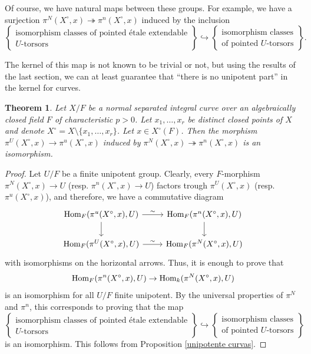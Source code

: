 \documentclass[a4paper,english,12pt]{amsart}
\newtheorem{theorem}[definition]{Theorem}
\numberwithin{equation}{section}
\newcommand{\Hom}{\textup{Hom}}
\renewcommand{\_}{\rule{0.25cm}{0.4pt}}
\begin{document}
Of course, we have natural maps between these groups. For example, we have a surjection $\pi^{N}(X^{\circ},x)\twoheadrightarrow \pi^{n}(X^{\circ},x)$ induced by the inclusion
\[
\left\{
\begin{array}{c}
\text{isomorphism classes of pointed étale extendable}\\
\text{$U$-torsors}
\end{array}
\right\}
\hookrightarrow
\left\{
\begin{array}{c}
\text{isomorphism classes}\\
\text{of pointed $U$-torsors}
\end{array}
\right\}.
\]

The kernel of this map is not known to be trivial or not, but using the results of the last section, we can at least guarantee that ``there is no unipotent part'' in the kernel for curves.

\begin{theorem}\label{unipotent fundamental group iso}
Let $X/F$ be a normal separated integral curve over an algebraically closed field $F$ of characteristic $p>0$. Let $x_{1},\dots, x_{r}$ be distinct closed points of $X$ and denote $X^{\circ}=X\setminus\{x_{1},\dots, x_{r}\}$. Let $x\in X^{\circ}(F)$. Then the morphism $\pi^{U}(X^{\circ},x)\to \pi^{u}(X^{\circ},x)$ induced by $\pi^{N}(X^{\circ},x)\twoheadrightarrow \pi^{n}(X^{\circ},x)$ is an isomorphism.
\end{theorem}
\begin{proof}
Let $U/F$ be a finite unipotent group. Clearly, every $F$-morphism $\pi^{N}(X^{\circ},x)\to U$ (resp. $\pi^{n}(X^{\circ},x)\to U$) factors trough $\pi^{U}(X^{\circ},x)$ (resp. $\pi^{u}(X^{\circ},x)$), and therefore, we have a commutative diagram
\[
\begin{tikzcd}
    \Hom_{F}(\pi^{u}(X^{\circ},x),U)\ar[r, "\sim"]\ar[d] & \Hom_{F}(\pi^{n}(X^{\circ},x),U)\ar[d]
    \\
    \Hom_{F}(\pi^{U}(X^{\circ},x),U)\ar[r, "\sim"] & \Hom_{F}(\pi^{N}(X^{\circ},x),U)
\end{tikzcd}
\]
with isomorphisms on the horizontal arrows. Thus, it is enough to prove that
\[
    \Hom_{F}(\pi^{n}(X^{\circ},x),U)\to \Hom_{k}(\pi^{N}(X^{\circ},x),U)
\]
is an isomorphism for all $U/F$ finite unipotent. By the universal properties of $\pi^{N}$ and $\pi^{n}$, this corresponds to proving that the map
\[
\left\{
\begin{array}{c}
\text{isomorphism classes of pointed étale extendable}\\
\text{$U$-torsors}
\end{array}
\right\}
\hookrightarrow
\left\{
\begin{array}{c}
\text{isomorphism classes}\\
\text{of pointed $U$-torsors}
\end{array}
\right\}
\]
is an isomorphism. This follows from Proposition \ref{unipotente curvas}.
\end{proof}

\printbibliography
\end{document}
